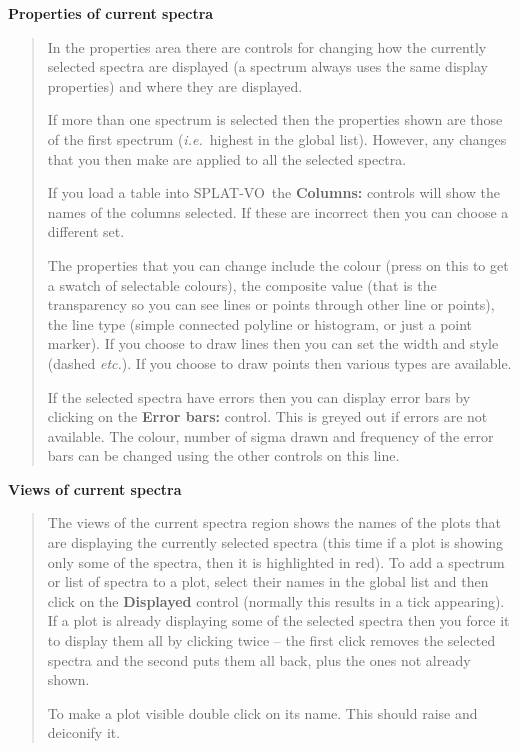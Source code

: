 \documentclass[twoside,11pt]{article}
\renewcommand{\_}{\texttt{\symbol{95}}}
\newcommand{\SPLAT}{\textsf{SPLAT-VO}}
\newcommand{\labelitem}[1]{\textbf{#1}}
\newcommand{\ie}{\textit{i.e.}}
\newcommand{\etc}{\textit{etc.}}
\newcommand{\subheading}[1]{\textbf{\large{#1}}}
\begin{document}
\subheading{Properties of current spectra}
\begin{quote}
 In the properties area there are controls for changing how the currently
 selected spectra are displayed (a spectrum always uses the same display
 properties) and where they are displayed.

 If more than one spectrum is selected then the properties shown are those of
 the first spectrum (\ie\ highest in the global list). However, any changes
 that you then make are applied to all the selected spectra.

 If you load a table into \SPLAT\ the \labelitem{Columns:} controls will show
 the names of the columns selected. If these are incorrect then you can choose
 a different set.

 The properties that you can change include the colour (press on this to get a
 swatch of selectable colours), the composite value (that is the transparency
 so you can see lines or points through other line or points), the line type
 (simple connected polyline or histogram, or just a point marker). If you
 choose to draw lines then you can set the width and style (dashed \etc). If
 you choose to draw points then various types are available.

 If the selected spectra have errors then you can display error bars by
 clicking on the \labelitem{Error bars:} control. This is greyed out if errors
 are not available. The colour, number of sigma drawn and frequency of the
 error bars can be changed using the other controls on this line.

\end{quote}

\subheading{Views of current spectra}
\begin{quote}
 The views of the current spectra region shows the names of the plots that are
 displaying the currently selected spectra (this time if a plot is showing
 only some of the spectra, then it is highlighted in red). To add a spectrum
 or list of spectra to a plot, select their names in the global list and then
 click on the \labelitem{Displayed} control (normally this results in a tick
 appearing). If a plot is already displaying some of the selected spectra then
 you force it to display them all by clicking twice -- the first click removes
 the selected spectra and the second puts them all back, plus the ones not
 already shown.

 To make a plot visible double click on its name. This should raise and
 deiconify it.
\end{quote}
\end{document}
